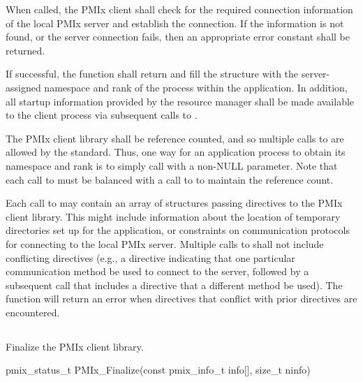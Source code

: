 When called, the PMIx client shall check for the required connection information of the local PMIx server and establish the connection.
If the information is not found, or the server connection fails, then an appropriate error constant shall be returned.

If successful, the function shall return  and fill the  structure with the server-assigned namespace and rank of the process within the application.
In addition, all startup information provided by the resource manager shall be made available to the client process via subsequent calls to .

The PMIx client library shall be reference counted, and so multiple calls to  are allowed by the standard.
Thus, one way for an application process to obtain its namespace and rank is to simply call  with a non-NULL  parameter.
Note that each call to  must be balanced with a call to  to maintain the reference count.

Each call to  may contain an array of  structures passing directives to the PMIx client library.
This might include information about the location of temporary directories set up for the application, or constraints on communication protocols for connecting to the local PMIx server.
Multiple calls to  shall not include conflicting directives (e.g., a directive indicating that one particular communication method be used to connect to the server, followed by a subsequent call that includes a directive that a different method be used).
The  function will return an error when directives that conflict with prior directives are encountered.


\subsection{}

\summary

Finalize the PMIx client library.

\format

\cspecificstart
\begin{codepar}
pmix_status_t
PMIx_Finalize(const pmix_info_t info[], size_t ninfo)
\end{codepar}
\cspecificend

\begin{arglist}
\end{arglist}

